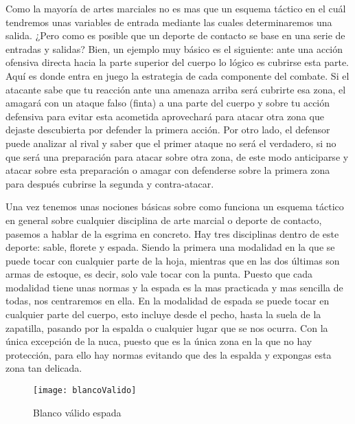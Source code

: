 Como la mayoría de artes marciales no es mas que un esquema táctico en el cuál tendremos unas variables
 de entrada mediante las cuales determinaremos una salida. ¿Pero como es posible que un deporte de contacto
 se base en una serie de entradas y salidas? Bien, un ejemplo muy básico es el siguiente: ante una acción ofensiva
 directa hacia la parte superior del cuerpo lo lógico es cubrirse esta parte. Aquí es donde entra en juego
 la estrategia de cada componente del combate. Si el atacante sabe que tu reacción ante una amenaza arriba
 será cubrirte esa zona, el amagará con un ataque falso (finta) a una parte del cuerpo y sobre tu acción
 defensiva para evitar esta acometida aprovechará para atacar otra zona que dejaste descubierta por
 defender la primera acción. Por otro lado, el defensor puede analizar al rival y saber que el primer ataque
 no será el verdadero, si no que será una preparación para atacar sobre otra zona, de este modo anticiparse
 y atacar sobre esta preparación o amagar con defenderse sobre la primera zona para después cubrirse la segunda
 y contra-atacar.

Una vez tenemos unas nociones básicas sobre como funciona un esquema táctico en general sobre cualquier
 disciplina de arte marcial o deporte de contacto, pasemos a hablar de la esgrima en concreto.
 Hay tres disciplinas dentro de este deporte: sable, florete y espada. Siendo la primera una modalidad
 en la que se puede tocar con cualquier parte de la hoja, mientras que en las dos últimas son armas de
 estoque, es decir, solo vale tocar con la punta. Puesto que cada modalidad tiene unas normas y la espada
 es la mas practicada y mas sencilla de todas, nos centraremos en ella. En la modalidad de espada se puede
 tocar en cualquier parte del cuerpo, esto incluye desde el pecho, hasta la suela de la zapatilla, pasando
 por la espalda o cualquier lugar que se nos ocurra. Con la única excepción de la nuca, puesto que es la única
 zona en la que no hay protección, para ello hay normas evitando que des la espalda y expongas esta zona
 tan delicada.

\begin{figure}[htb]
	\centering
	\texttt{[image: blancoValido]}
	\caption[Blanco válido espada]{Blanco válido espada}
	\label{fig:blancoValido}
\end{figure}

